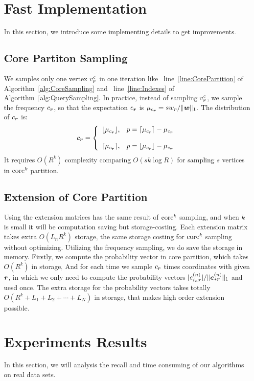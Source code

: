 \documentclass[letterpaper]{article}
\newcommand{\Sca}[3]{{#1}^{(#2)}_{i_#2#3}}%
\newcommand{\V}[1]{{\bm{{\MakeLowercase{#1}}}}}
\newcommand{\VnC}[3]{\V{#1}^{(#2)}_{#3}}
\newcommand{\norm}[2]{\|#1\|_{#2}}
\newcommand{\AlgLine}[2]{line~\ref{line:#2} of Algorithm~\ref{alg:#1}}
\begin{document}
\section{Fast Implementation}
In this section, we introduce some implementing details to get improvements.
\subsection{Core Partiton Sampling}
We samples only one vertex $v^c_\V{r}$ in one iteration like
~\AlgLine{CoreSampling}{CorePartition} and ~\AlgLine{QuerySampling}{Indexes}.
In practice, instead of sampling $v^c_\V{r}$, we sample the frequency $c_\V{r}$,
so that the expectation $c_\V{r}$ is $\mu_{c_\V{r}}=sw_\V{r}/\norm{\V{w}}{1}$.
The distribution of $c_\V{r}$ is:
\begin{equation*}c_\V{r}=
    \left\{
      \begin{array}{ll}
        \lfloor \mu_{c_\V{r}} \rfloor,
        & \hbox{$p=\lceil \mu_{c_\V{r}} \rceil - \mu_{c_\V{r}}$} \\\\
        \lceil \mu_{c_\V{r}} \rceil,
        & \hbox{$p=\lfloor \mu_{c_\V{r}} \rfloor - \mu_{c_\V{r}}$}
      \end{array}
    \right.
\end{equation*}
It requires $O(R^k)$ complexity comparing $O(sk\log{R})$
for sampling $s$ vertices in ${\rm core}^k$ partition.
\subsection{Extension of Core Partition}
Using the extension matrices has the same result of ${\rm core}^k$ sampling,
and when $k$ is small it will be computation saving but storage-costing.
Each extension matrix takes extra $O(L_nR^k)$ storage,
the same storage costing for ${\rm core}^k$ sampling without optimizing.
Utilizing the frequency sampling, we do save the storage in memory.
Firstly, we compute the probability vector in core partition, which takes $O(R^k)$ in storage,
And for each time we sample $c_{\V{r}}$ times coordinates with given $\V{r}$,
in which we only need to compute the probability vectors
$|\Sca{e}{n}{\V{r}}|/\norm{\VnC{e}{n}{*\V{r}}}{1}$ and uesd once.
The extra storage for the probability vectors takes totally
$O(R^k + L_1 + L_2 + \cdots + L_N)$ in storage,
that makes high order extension possible.
\section{Experiments Results}
In this section, we will analysis the recall
and time consuming of our algorithms on real data sets.
\end{document}
